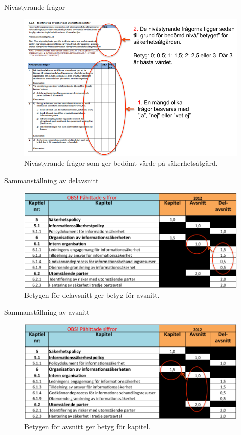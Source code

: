 \documentclass{beamer}
\begin{document}
\begin{frame}{Nivåstyrande frågor}
  \begin{figure}
    \includegraphics[height=0.7\textheight]{gap-nivafragor.png}
    \caption{Nivåstyrande frågor som ger bedömt värde på säkerhetsåtgärd.}
  \end{figure}
\end{frame}
\begin{frame}{Sammanställning av delavsnitt}
  \begin{figure}
    \includegraphics[width=\textwidth]{gap-sammanstallning.png}
    \caption{Betygen för delavsnitt ger betyg för avsnitt.}
  \end{figure}
\end{frame}
\begin{frame}{Sammanställning av avsnitt}
  \begin{figure}
    \includegraphics[width=\textwidth]{gap-kapitel.png}
    \caption{Betygen för avsnitt ger betyg för kapitel.}
  \end{figure}
\end{frame}
\end{document}
